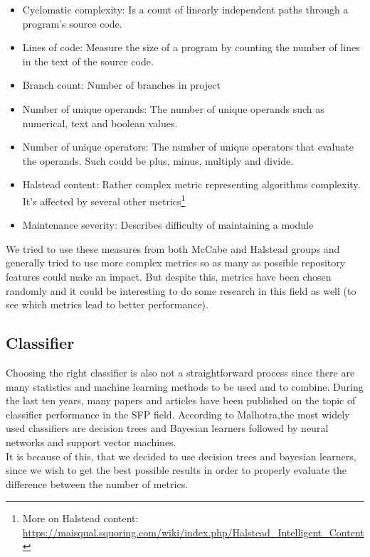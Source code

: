 \begin{itemize}
\item Cyclomatic complexity: Is a count of linearly independent paths through a program's source code. 
\item Lines of code: Measure the size of a program by counting the number of lines in the text of the source code.
\item Branch count: Number of branches in project 
\item Number of unique operands: The number of unique operands such as numerical, text and boolean values.
\item Number of unique operators: The number of unique operators that evaluate the operands. Such could be plus, minus, multiply and divide. 
\item Halstead content: Rather complex metric representing algorithms complexity. It's affected by several other metrics\footnote{More on Halstead content: \url{https://maisqual.squoring.com/wiki/index.php/Halstead_Intelligent_Content}}

\item Maintenance severity: Describes difficulty of maintaining a module
\end{itemize}

We tried to use these measures from both McCabe and Halstead groups and generally tried to use more complex metrics so as many as possible repository features could make an impact. But despite this, metrics have been chosen randomly and it could be interesting to do some research in this field as well (to see which metrics lead to better performance).

\subsection{Classifier}
Choosing the right classifier is also not a straightforward process since there are many statistics and machine learning methods to be used and to combine. During the last ten years, many papers and articles have been published on the topic of classifier performance in the SFP field. According to Malhotra\cite{malhotra2015systematic},the most widely used classifiers are decision trees and Bayesian learners followed by neural networks and support vector machines\cite[p.~11]{malhotra2015systematic}.\\
It is because of this, that we decided to use decision trees and bayesian learners, since we wish to get the best possible results in order to properly evaluate the difference between the number of metrics.
